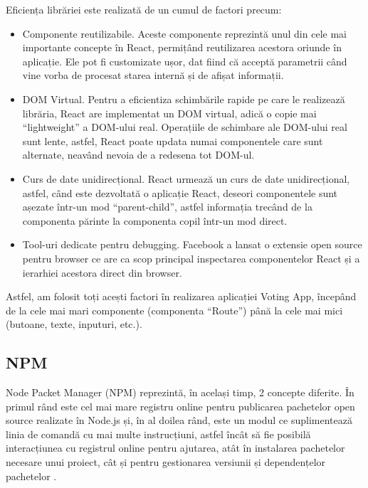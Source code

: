 Eficiența librăriei este realizată de un cumul de factori precum:

\begin{itemize}
    \item Componente reutilizabile. Aceste componente reprezintă unul din cele mai importante concepte în React, permițând reutilizarea acestora oriunde în aplicație. Ele pot fi customizate ușor, dat fiind că acceptă parametrii când vine vorba de procesat starea internă și de afișat informații.
    
    \item DOM Virtual. Pentru a eficientiza schimbările rapide pe care le realizează librăria, React are implementat un DOM virtual, adică o copie mai \enquote{lightweight} a DOM-ului real. Operațiile de schimbare ale DOM-ului real sunt lente, astfel, React poate updata numai componentele care sunt alternate, neavând nevoia de a redesena tot DOM-ul.
    
    \item Curs de date unidirecțional. React urmează un curs de date unidirecțional, astfel, când este dezvoltată o aplicație React, deseori componentele sunt așezate într-un mod \enquote{parent-child}, astfel informația trecând de la componenta părinte la componenta copil într-un mod direct.
    
    \item Tool-uri dedicate pentru debugging. Facebook a lansat o extensie open source pentru browser ce are ca scop principal inspectarea componentelor React și a ierarhiei acestora direct din browser.
    
\end{itemize}

Astfel, am folosit toți acești factori în realizarea aplicației Voting App, începând de la cele mai mari componente (componenta \enquote{Route}) până la cele mai mici (butoane, texte, inputuri, etc.).

\subsection{NPM}

Node Packet Manager (NPM) reprezintă, în același timp, 2 concepte diferite. În primul rând este cel mai mare registru online pentru publicarea pachetelor open source realizate în Node.js și, în al doilea rând, este un modul ce suplimentează linia de comandă cu mai multe instrucțiuni, astfel încât să fie posibilă interacțiunea cu registrul online pentru ajutarea, atât în instalarea pachetelor necesare unui proiect, cât și pentru gestionarea versiunii și dependențelor pachetelor \cite{what_is_npm}.

